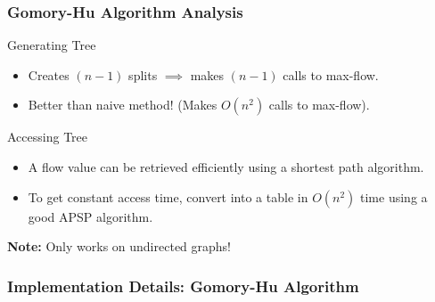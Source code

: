 \documentclass[mathserif]{beamer}
\begin{document}
\begin{frame}
	\frametitle{Gomory-Hu Algorithm Analysis}
		\begin{block}{Generating Tree}		
		\begin{itemize}
			\item Creates $(n-1)$ splits $\implies$ makes $(n-1)$ calls to max-flow.\\
			\item Better than naive method! (Makes $O(n^2)$ calls to max-flow).\\
		\end{itemize}
		\end{block}

		\begin{block}{Accessing Tree}
			\begin{itemize}
		\item A flow value can be retrieved efficiently using a shortest path algorithm.\\
		\item To get constant access time, convert into a table in $O(n^2)$ time using a good APSP algorithm.
		\end{itemize}
		\end{block}

		\textbf{Note:} Only works on undirected graphs!
\end{frame}

\begin{frame}
	\frametitle{Implementation Details: Gomory-Hu Algorithm}
	
\end{frame}
\end{document}
